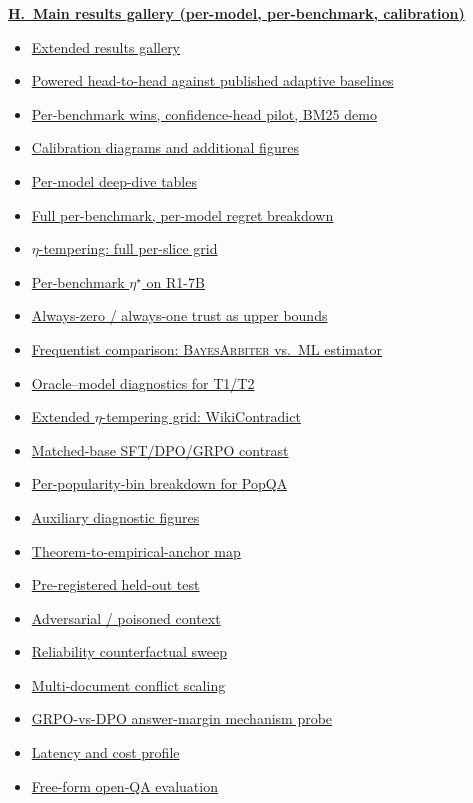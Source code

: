 \begin{tcolorbox}
{\textbf{\hyperref[app:letter-H]{H.\ Main results gallery (per-model, per-benchmark, calibration)}}
\begin{itemize}
  \item \hyperref[app:extended-results]{Extended results gallery}
  \item \hyperref[app:powered-headtohead]{Powered head-to-head against published adaptive baselines}
  \item \hyperref[app:per-bench-wins]{Per-benchmark wins, confidence-head pilot, BM25 demo}
  \item \hyperref[app:calibration-diagrams]{Calibration diagrams and additional figures}
  \item \hyperref[app:per-model-deep-dive]{Per-model deep-dive tables}
  \item \hyperref[app:full-breakdown]{Full per-benchmark, per-model regret breakdown}
  \item \hyperref[app:eta-grid]{$\eta$-tempering: full per-slice grid}
  \item \hyperref[app:eta-r1-7b]{Per-benchmark $\eta^\star$ on R1-7B}
  \item \hyperref[app:trust-extremes]{Always-zero / always-one trust as upper bounds}
  \item \hyperref[app:frequentist]{Frequentist comparison: \textsc{BayesArbiter} vs.\ ML estimator}
  \item \hyperref[app:oracle-diagnostics]{Oracle--model diagnostics for T1/T2}
  \item \hyperref[app:eta-wiki-extended]{Extended $\eta$-tempering grid: WikiContradict}
  \item \hyperref[app:matched-base]{Matched-base SFT/DPO/GRPO contrast}
  \item \hyperref[app:popqa-bins-detail]{Per-popularity-bin breakdown for PopQA}
  \item \hyperref[app:brier-vs-K]{Auxiliary diagnostic figures}
  \item \hyperref[app:thm-map]{Theorem-to-empirical-anchor map}
  \item \hyperref[app:preregistered-heldout]{Pre-registered held-out test}
  \item \hyperref[app:adversarial-context]{Adversarial / poisoned context}
  \item \hyperref[app:reliability-noise-ablation]{Reliability counterfactual sweep}
  \item \hyperref[app:multidoc-scaling]{Multi-document conflict scaling}
  \item \hyperref[app:mechanism-grpo-dpo]{GRPO-vs-DPO answer-margin mechanism probe}
  \item \hyperref[app:latency-profile]{Latency and cost profile}
  \item \hyperref[app:freeform-openqa]{Free-form open-QA evaluation}
\end{itemize}

}
\end{tcolorbox}
